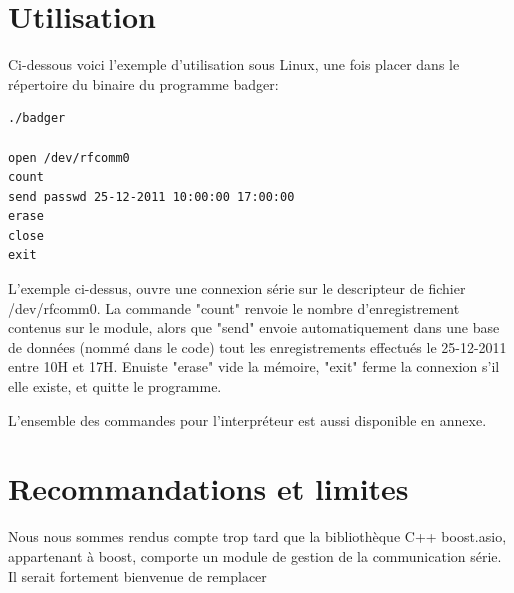 \section{Utilisation}
    Ci-dessous voici l'exemple d'utilisation sous Linux, une fois placer dans le
répertoire du binaire du programme badger:

    \begin{lstlisting}
./badger

open /dev/rfcomm0
count
send passwd 25-12-2011 10:00:00 17:00:00
erase
close
exit
    \end{lstlisting}

    L'exemple ci-dessus, ouvre une connexion série sur le descripteur de fichier
/dev/rfcomm0. La commande "count" renvoie le nombre d'enregistrement contenus sur 
le module, alors que "send" envoie automatiquement dans une base de données (nommé
dans le code) tout les enregistrements effectués le 25-12-2011 entre 10H et 17H.
Enuiste "erase" vide la mémoire, "exit" ferme la connexion s'il elle existe, et
quitte le programme.

    L'ensemble des commandes pour l'interpréteur est aussi disponible en annexe.




\section{Recommandations et limites}
    Nous nous sommes rendus compte trop tard que la bibliothèque C++ boost.asio,
appartenant à boost, comporte un module de gestion de la communication série. Il
serait fortement bienvenue de remplacer 
 

